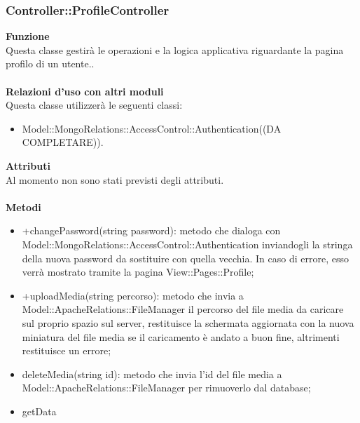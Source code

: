 {				\subsubsection{Controller::ProfileController}{
					\textbf{Funzione}\\
					\indent Questa classe gestirà le operazioni e la logica applicativa riguardante la pagina profilo di un utente..\\\\
					\textbf{Relazioni d'uso con altri moduli}\\
					\indent Questa classe utilizzerà le seguenti classi:
					\begin{itemize}
						\item Model::MongoRelations::AccessControl::Authentication((DA COMPLETARE)).
					\end{itemize}
					\textbf{Attributi}\\
					\indent Al momento non sono stati previsti degli attributi.\\\\
					\textbf{Metodi}
					\begin{itemize}
						\item +changePassword(string password): metodo che dialoga con Model::MongoRelations::AccessControl::Authentication inviandogli la stringa della nuova password da sostituire con quella vecchia. In caso di errore, esso verrà mostrato tramite la pagina View::Pages::Profile;
						\item +uploadMedia(string percorso): metodo che invia a Model::ApacheRelations::FileManager il percorso del file media da caricare sul proprio spazio sul server, restituisce la schermata aggiornata con la nuova miniatura del file media se il caricamento è andato a buon fine, altrimenti restituisce un errore;
						\item deleteMedia(string id): metodo che invia l'id del file media a Model::ApacheRelations::FileManager per rimuoverlo dal database;
						\item getData
					\end{itemize}
				}
}
